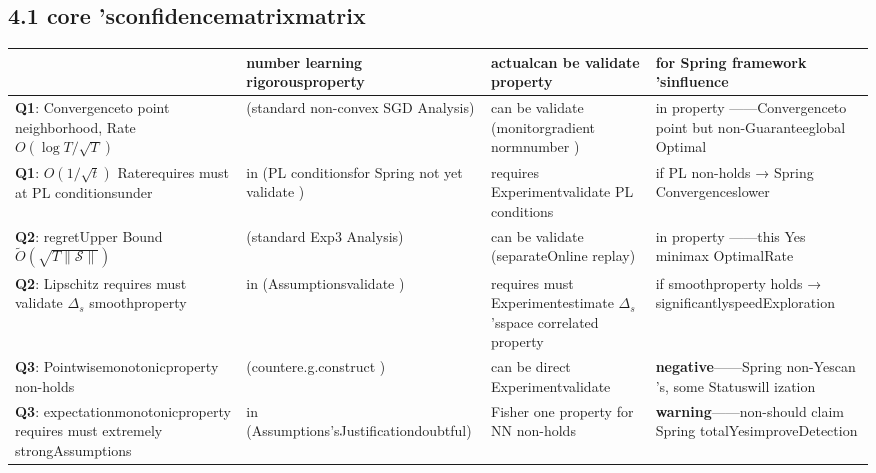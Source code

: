 \documentclass[
  12pt,
]{article}
\begin{document}
\subsection{4.1
core 'sconfidencematrixmatrix }\label{ux4e09ux4e2aux6838ux5fc3ux53d1ux73b0ux7684ux7f6eux4fe1ux5ea6ux77e9ux9635}

\begin{longtable}[]{@{}
  >{\raggedright\arraybackslash}p{}
  >{\raggedright\arraybackslash}p{}
  >{\raggedright\arraybackslash}p{}
  >{\raggedright\arraybackslash}p{}@{}}
\toprule\noalign{}
\begin{minipage}[b]{\linewidth}\raggedright

\end{minipage} & \begin{minipage}[b]{\linewidth}\raggedright
number learning rigorousproperty 
\end{minipage} & \begin{minipage}[b]{\linewidth}\raggedright
actualcan be validate property 
\end{minipage} & \begin{minipage}[b]{\linewidth}\raggedright
for  Spring framework 'sinfluence 
\end{minipage} \\
\midrule\noalign{}
\endhead
\bottomrule\noalign{}
\endlastfoot
\textbf{Q1}: Convergenceto point neighborhood, Rate \(O(\log T/\sqrt{T})\) & (standard non-convex
SGD Analysis) & can be validate (monitorgradient normnumber ) &
in property ------Convergenceto point but non-Guaranteeglobal Optimal \\
\textbf{Q1}: \(O(1/\sqrt{t})\) Raterequires must at  PL conditionsunder  & in (PL conditionsfor 
Spring not yet validate ) & requires Experimentvalidate  PL conditions & if  PL non-holds → Spring Convergenceslower \\
\textbf{Q2}: regretUpper Bound \(\tilde{O}(\sqrt{T\|\mathcal{S}\|})\) & (standard 
Exp3 Analysis) & can be validate (separateOnline replay) & in property ------this Yes minimax OptimalRate \\
\textbf{Q2}: Lipschitz requires must validate  \(\Delta_s\) smoothproperty  &
in (Assumptionsvalidate ) & requires must Experimentestimate \(\Delta_s\) 'sspace correlated property  & if smoothproperty holds
→ significantlyspeedExploration \\
\textbf{Q3}: Pointwisemonotonicproperty non-holds & (countere.g.construct ) & can be direct Experimentvalidate  &
\textbf{negative}------Spring non-Yescan 's, some Statuswill ization  \\
\textbf{Q3}: expectationmonotonicproperty requires must extremely strongAssumptions & in (Assumptions'sJustificationdoubtful) & Fisher
one property for  NN non-holds & \textbf{warning}------non-should claim Spring
totalYesimproveDetection \\
\end{longtable}
\end{document}
